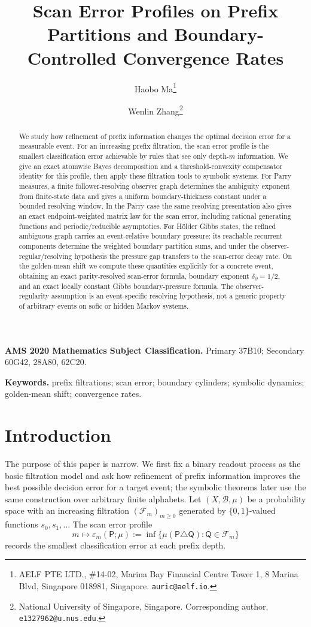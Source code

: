 \documentclass{etds}%
\title{Scan Error Profiles on Prefix Partitions and Boundary-Controlled Convergence Rates}
\author{Haobo Ma\thanks{AELF PTE LTD., \#14-02, Marina Bay Financial Centre Tower 1, 8 Marina Blvd, Singapore 018981, Singapore. \texttt{auric@aelf.io}.}
\and
Wenlin Zhang\thanks{National University of Singapore, Singapore. Corresponding author. \texttt{e1327962@u.nus.edu}.}}
\date{}
\numberwithin{equation}{section}
\theoremstyle{plain}
\theoremstyle{definition}
\theoremstyle{remark}
\begin{document}
\maketitle

\begin{abstract}
We study how refinement of prefix information changes the optimal decision
error for a measurable event.  For an increasing prefix filtration, the scan
error profile is the smallest classification error achievable by rules that
see only depth-$m$ information.  We give an exact atomwise Bayes decomposition
and a threshold-convexity compensator identity for this profile, then apply
these filtration tools to symbolic systems.  For Parry measures, a finite
follower-resolving observer graph determines the ambiguity exponent from
finite-state data and gives a uniform boundary-thickness constant under a
bounded resolving window.  In the Parry case the same resolving presentation
also gives an exact endpoint-weighted matrix law for the scan error, including
rational generating functions and periodic/reducible asymptotics.  For H\"older Gibbs states, the refined ambiguous
graph carries an event-relative boundary pressure: its reachable recurrent
components determine the weighted boundary partition sums, and under the
observer-regular/resolving hypothesis the pressure gap transfers to the
scan-error decay rate.  On the golden-mean shift we compute these quantities
explicitly for a concrete event, obtaining an exact parity-resolved scan-error
formula, boundary exponent $\delta_\partial=1/2$, and an exact locally constant
Gibbs boundary-pressure formula.  The observer-regularity assumption is an
event-specific resolving hypothesis, not a generic property of arbitrary
events on sofic or hidden Markov systems.
\end{abstract}

\noindent\textbf{AMS 2020 Mathematics Subject Classification.}
Primary 37B10; Secondary 60G42, 28A80, 62C20.

\medskip
\noindent\textbf{Keywords.}
prefix filtrations; scan error; boundary cylinders; symbolic dynamics;
golden-mean shift; convergence rates.

\section{Introduction}
\label{sec:intro}

The purpose of this paper is narrow.  We first fix a binary readout process
as the basic filtration model and ask how refinement of prefix information
improves the best possible decision error for a target event; the symbolic
theorems later use the same construction over arbitrary finite alphabets.  Let
$(X,\mathcal{B},\mu)$ be a probability space with an increasing filtration
$(\mathcal{F}_m)_{m\ge 0}$ generated by $\{0,1\}$-valued functions
$s_0,s_1,\ldots$  The scan error profile
\[
m\longmapsto\varepsilon_m(\mathsf{P};\mu)
:=\inf\bigl\{\mu(\mathsf{P}\triangle\mathsf{Q}):\mathsf{Q}\in\mathcal{F}_m\bigr\}
\]
records the smallest classification error at each prefix depth.
\end{document}
